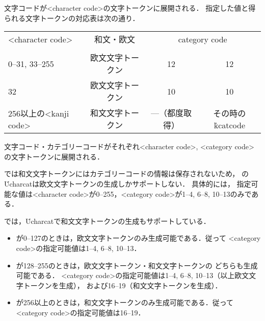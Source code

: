 \documentclass[a4paper,11pt,nomag,dvipdfmx]{jsarticle}
\begin{document}
\begin{cslist}
  文字コードが<character code>の文字トークンに展開される．
  指定した値と得られる文字トークンの対応表は次の通り．

  \begin{center}
	\small\medskip
	\begin{tabular}{lccc}
	  \toprule
	  <character code>&和文・欧文&\multicolumn{2}{c}{category code}\\\cmidrule(lr){3-4}
	  &&\epTeX&\eupTeX\\
	  \midrule
	  0--31, 33--255&欧文文字トークン&12&12\\
	  32            &欧文文字トークン&10&10\\
	  256以上の<kanji code>&和文文字トークン&---（都度取得）&その時の\.{kcatcode}\footnotemark\\
	  \bottomrule
	\end{tabular}
  \end{center}

  文字コード・カテゴリーコードがそれぞれ<character code>, <category code>の文字トークンに展開される．

  \epTeX では和文文字トークンにはカテゴリーコードの情報は保存されないため，
  \epTeX の\.{Ucharcat}は欧文文字トークンの生成しかサポートしない．
  具体的には，
  指定可能な値は<character code>が0--255，<category code>が1--4, 6--8, 10--13のみである．
\end{cslist}
\begin{dangerous}
  \eupTeX では，\.{Ucharcat}で和文文字トークンの生成もサポートしている．

  \medskip
  \begin{itemize}
	\item <character code>が0--127のときは，欧文文字トークンのみ生成可能である．従って
	<category code>の指定可能値は1--4, 6--8, 10--13．
	\item <character code>が128--255のときは，欧文文字トークン・和文文字トークンの
	どちらも生成可能である．
	<category code>の指定可能値は1--4, 6--8, 10--13（以上欧文文字トークンを生成），
	および16--19（和文文字トークンを生成）．
	\item <character code>が256以上のときは，和文文字トークンのみ生成可能である．従って
	<category code>の指定可能値は16--19．
  \end{itemize}
\end{dangerous}
\end{document}
